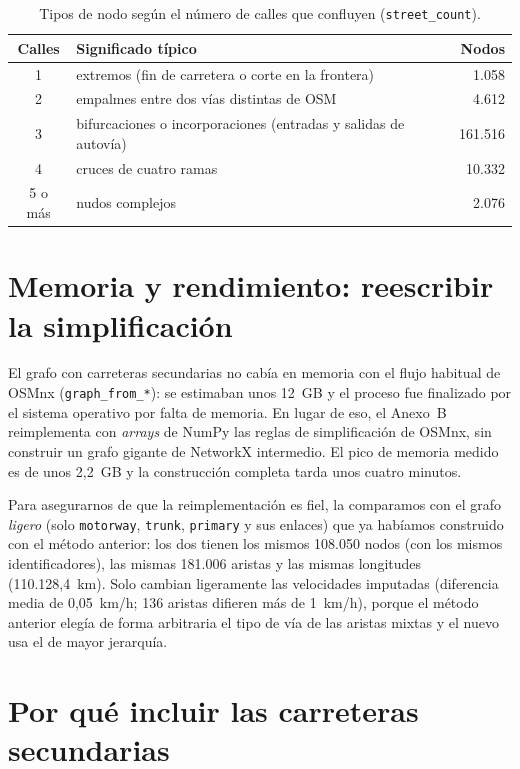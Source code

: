\begin{table}[htbp]
  \centering
  \caption{Tipos de nodo según el número de calles que confluyen (\texttt{street\_count}).}\label{tab:nodos}
  \small
  \begin{tabularx}{0.92\linewidth}{@{}c X r@{}}
    \toprule
    Calles & Significado típico & Nodos \\
    \midrule
    1 & extremos (fin de carretera o corte en la frontera) & 1.058 \\
    2 & empalmes entre dos vías distintas de OSM & 4.612 \\
    3 & bifurcaciones o incorporaciones (entradas y salidas de autovía) & 161.516 \\
    4 & cruces de cuatro ramas & 10.332 \\
    5 o más & nudos complejos & 2.076 \\
    \bottomrule
  \end{tabularx}
\end{table}

\section{Memoria y rendimiento: reescribir la simplificación}

El grafo con carreteras secundarias no cabía en memoria con el flujo habitual de OSMnx (\texttt{graph\_from\_*}): se estimaban unos 12~GB y el proceso fue finalizado por el sistema operativo por falta
de memoria. En lugar de eso, el Anexo~B reimplementa con \emph{arrays} de NumPy las reglas de simplificación de OSMnx, sin construir un grafo gigante de NetworkX intermedio. El pico de memoria medido es de
unos 2,2~GB y la construcción completa tarda unos cuatro minutos.

Para asegurarnos de que la reimplementación es fiel, la comparamos con el grafo \emph{ligero} (solo \texttt{motorway}, \texttt{trunk}, \texttt{primary} y sus enlaces) que ya habíamos construido con el método anterior:
los dos tienen los mismos 108.050 nodos (con los mismos identificadores), las mismas 181.006 aristas y las mismas longitudes (110.128,4~km). Solo cambian ligeramente las velocidades imputadas (diferencia media de
0,05~km/h; 136 aristas difieren más de 1~km/h), porque el método anterior elegía de forma arbitraria el tipo de vía de las aristas mixtas y el nuevo usa el de mayor jerarquía.

\section{Por qué incluir las carreteras secundarias}

